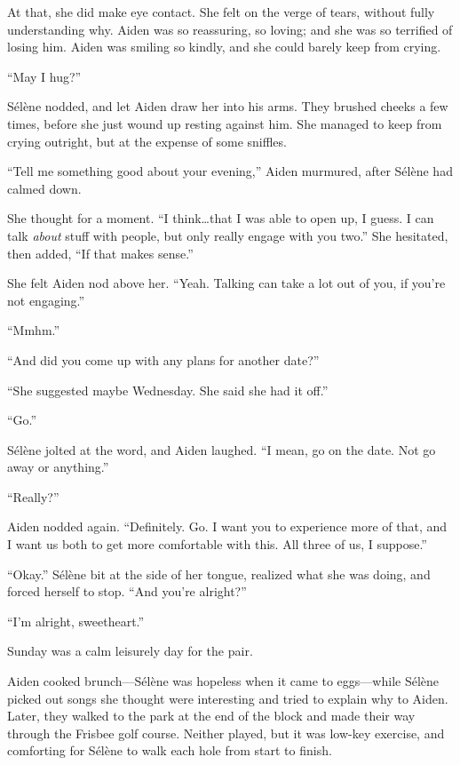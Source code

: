 At that, she did make eye contact. She felt on the verge of tears, without fully understanding why. Aiden was so reassuring, so loving; and she was so terrified of losing him. Aiden was smiling so kindly, and she could barely keep from crying.

``May I hug?''

Sélène nodded, and let Aiden draw her into his arms. They brushed cheeks a few times, before she just wound up resting against him. She managed to keep from crying outright, but at the expense of some sniffles.

``Tell me something good about your evening,'' Aiden murmured, after Sélène had calmed down.

She thought for a moment. ``I think\ldots{}that I was able to open up, I guess. I can talk \emph{about} stuff with people, but only really engage with you two.'' She hesitated, then added, ``If that makes sense.''

She felt Aiden nod above her. ``Yeah. Talking can take a lot out of you, if you're not engaging.''

``Mmhm.''

``And did you come up with any plans for another date?''

``She suggested maybe Wednesday. She said she had it off.''

``Go.''

Sélène jolted at the word, and Aiden laughed. ``I mean, go on the date. Not go away or anything.''

``Really?''

Aiden nodded again. ``Definitely. Go. I want you to experience more of that, and I want us both to get more comfortable with this. All three of us, I suppose.''

``Okay.'' Sélène bit at the side of her tongue, realized what she was doing, and forced herself to stop. ``And you're alright?''

``I'm alright, sweetheart.''

\secdiv{}

\noindent Sunday was a calm leisurely day for the pair.

Aiden cooked brunch---Sélène was hopeless when it came to eggs---while Sélène picked out songs she thought were interesting and tried to explain why to Aiden. Later, they walked to the park at the end of the block and made their way through the Frisbee golf course. Neither played, but it was low-key exercise, and comforting for Sélène to walk each hole from start to finish.

